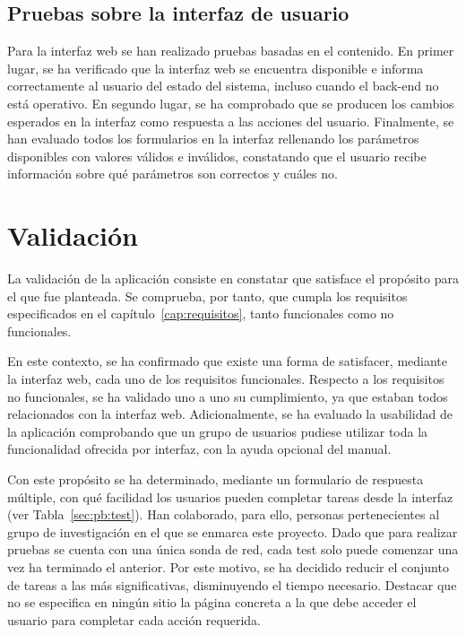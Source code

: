 \subsection*{Pruebas sobre la interfaz de usuario\label{ssec:pb:interfaz}}

Para la interfaz web se han realizado pruebas basadas en el contenido.
En primer lugar, se ha verificado que la interfaz web se encuentra disponible e informa correctamente al usuario del estado del sistema, incluso cuando el \gls{back-end} no está operativo.
En segundo lugar, se ha comprobado que se producen los cambios esperados en la interfaz como respuesta a las acciones del usuario.
Finalmente, se han evaluado todos los formularios en la interfaz rellenando los parámetros disponibles con valores válidos e inválidos, constatando que el usuario recibe información sobre qué parámetros son correctos y cuáles no.

\section{Validación\label{sec:pb:validacion}}

La validación de la aplicación consiste en constatar que satisface el propósito para el que fue planteada.
Se comprueba, por tanto, que cumpla los requisitos especificados en el capítulo~\ref{cap:requisitos}, tanto funcionales como no funcionales.

En este contexto, se ha confirmado que existe una forma de satisfacer, mediante la interfaz web, cada uno de los requisitos funcionales.
Respecto a los requisitos no funcionales, se ha validado uno a uno su cumplimiento, ya que estaban todos relacionados con la interfaz web.
Adicionalmente, se ha evaluado la usabilidad de la aplicación comprobando que un grupo de usuarios pudiese utilizar toda la funcionalidad ofrecida por interfaz, con la ayuda opcional del manual.

Con este propósito se ha determinado, mediante un formulario de respuesta múltiple, con qué facilidad los usuarios pueden completar tareas desde la interfaz (ver Tabla~\ref{sec:pb:test}).
Han colaborado, para ello, personas pertenecientes al grupo de investigación en el que se enmarca este proyecto.
Dado que para realizar pruebas se cuenta con una única sonda de red, cada test solo puede comenzar una vez ha terminado el anterior.
Por este motivo, se ha decidido reducir el conjunto de tareas a las más significativas, disminuyendo el tiempo necesario.
Destacar que no se especifica en ningún sitio la página concreta a la que debe acceder el usuario para completar cada acción requerida.

